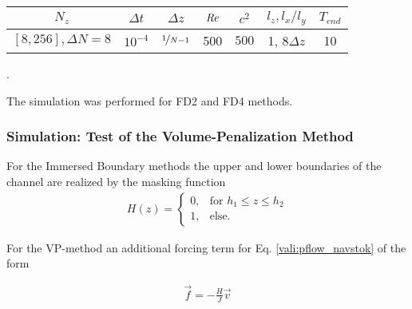 \begin{center}
\vspace*{0.7ex}
\begin{tabular}{c|c|c|c|c|c|c }
 $ N_z  $                   & $\Delta t$ & $\Delta z$            & $\mbox{\textit{Re}}$  & $c^2$   & $l_z, l_x/l_y$ & $T_{end}$\\
\hline
 $[8, 256], \Delta N = 8 $& $10^{-4}$ & $\nicefrac{1}{N - 1}$ & 500     & $500$   &  1, 8$\Delta z$ &  10\\
\end{tabular}.
\vspace*{0.7ex}
\end{center}

The simulation was performed for FD2 and FD4 methods.

\subsubsection{Simulation: Test of the Volume-Penalization Method}


For the Immersed Boundary methods the upper and lower boundaries of the channel are realized by the masking function
\begin{align}
H(z) = \begin{cases}
                    0, & \text{for \  }  h_1 \leq z \leq h_2 \\
                    1, & \text{else}.
             \end{cases}
\end{align}

For the VP-method an additional forcing term for Eq. \ref{vali:pflow_navstok} of the form

\begin{align}
    \vec{f} = -\frac{H}{J}\vec{v}
\end{align}

